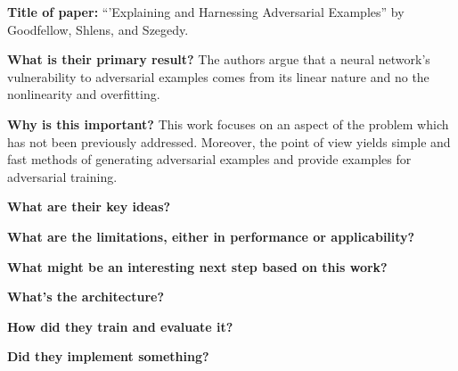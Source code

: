 \noindent \textbf{Title of paper:} ``'Explaining and Harnessing Adversarial
Examples'' by Goodfellow, Shlens, and Szegedy. 

\noindent\textbf{What is their primary result?} The authors argue that a neural
network's vulnerability to adversarial examples comes from its linear nature and
no the nonlinearity and overfitting. 

\noindent\textbf{Why is this important?} This work focuses on an aspect of the
problem which has not been previously addressed. Moreover, the point of view
yields simple and fast methods of generating adversarial examples and provide
examples for adversarial training. 

\noindent\textbf{What are their key ideas?}

\noindent\textbf{What are the limitations, either in performance or applicability?}

\noindent\textbf{What might be an interesting next step based on this work?}

\noindent\textbf{What's the architecture?}

\noindent\textbf{How did they train and evaluate it?}

\noindent\textbf{Did they implement something?}












